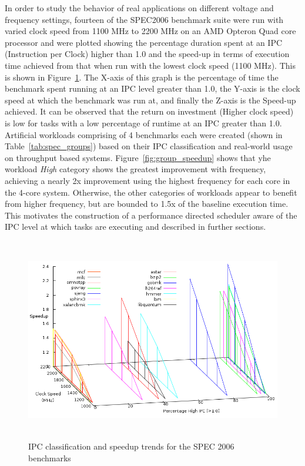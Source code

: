 In order to study the behavior of real applications on different voltage and frequency settings,
fourteen of the SPEC2006 \cite{spec:2006} benchmark suite were run with varied clock speed 
from 1100 MHz to 2200 MHz on an AMD Opteron Quad core processor and were plotted showing the 
percentage duration spent at an IPC (Instruction per Clock) higher than 1.0 and the 
speed-up in terms of execution time achieved from that when run with the lowest clock speed (1100 MHz). 
This is shown in Figure~\ref{fig:spec_classify}.
The X-axis of this graph is the percentage of time the benchmark spent running at an IPC level greater
than 1.0, the Y-axis is the clock speed at which the benchmark was run at, and finally the Z-axis 
is the Speed-up achieved. It can be observed that the return on investment (Higher clock speed)
is low for tasks with a low percentage of runtime at an IPC greater than 1.0. Artificial workloads
comprising of 4 benchmarks each were created (shown in Table~\ref{tab:spec_groups}) based on their IPC classification
and real-world usage on throughput based systems. Figure~\ref{fig:group_speedup} shows that yhe workload 
\textit{High} category shows the greatest improvement with frequency, achieving a nearly 2x improvement using the highest
frequency for each core in the 4-core system.  Otherwise, the other
categories of workloads appear to benefit from higher frequency, but
are bounded to 1.5x of the baseline execution time.
This motivates the construction of a performance directed scheduler aware of the IPC
level at which tasks are executing and described in further sections. 

\begin{figure}[h!]
  \begin{center}
    \includegraphics[height=3.5in]{figures/Speedup_Classify.png}%
    \caption{IPC classification and speedup trends for the SPEC 2006 benchmarks}
    \label{fig:spec_classify}
  \end{center}
\end{figure}

